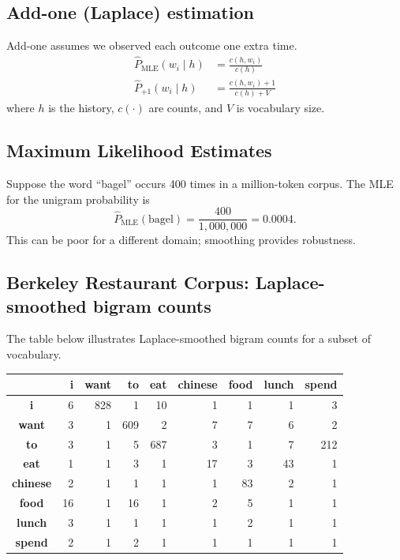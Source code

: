 \documentclass[11pt,a4paper]{article}
\theoremstyle{definition}
\theoremstyle{plain}
\theoremstyle{remark}
\begin{document}
\subsection{Add-one (Laplace) estimation}
Add-one assumes we observed each outcome one extra time.
\begin{align*}
\hat P_{\text{MLE}}(w_i\mid h) 
&= \frac{c(h,w_i)}{c(h)}\\
\hat P_{+1}(w_i\mid h) 
&= \frac{c(h,w_i)+1}{c(h)+V}
\end{align*}
where $h$ is the history, $c(\cdot)$ are counts, and $V$ is vocabulary size.

\subsection{Maximum Likelihood Estimates}
Suppose the word ``bagel'' occurs 400 times in a million-token corpus. The MLE for the unigram probability is
\[
\hat P_{\text{MLE}}(\text{bagel}) = \frac{400}{1{,}000{,}000} = 0.0004.
\]
This can be poor for a different domain; smoothing provides robustness.

\subsection{Berkeley Restaurant Corpus: Laplace-smoothed bigram counts}
The table below illustrates Laplace-smoothed bigram counts for a subset of vocabulary.

\begin{center}
\setlength{\tabcolsep}{6pt}
\renewcommand{\arraystretch}{1.2}
\scriptsize
\begin{tabular}{|c|r|r|r|r|r|r|r|r|}
\hline
 & \textbf{i} & \textbf{want} & \textbf{to} & \textbf{eat} & \textbf{chinese} & \textbf{food} & \textbf{lunch} & \textbf{spend} \\ \hline
\textbf{i}       & 6   & 828 & 1   & 10  & 1   & 1  & 1  & 3   \\ \hline
\textbf{want}    & 3   & 1   & 609 & 2   & 7   & 7  & 6  & 2   \\ \hline
\textbf{to}      & 3   & 1   & 5   & 687 & 3   & 1  & 7  & 212 \\ \hline
\textbf{eat}     & 1   & 1   & 3   & 1   & 17  & 3  & 43 & 1   \\ \hline
\textbf{chinese} & 2   & 1   & 1   & 1   & 1   & 83 & 2  & 1   \\ \hline
\textbf{food}    & 16  & 1   & 16  & 1   & 2   & 5  & 1  & 1   \\ \hline
\textbf{lunch}   & 3   & 1   & 1   & 1   & 1   & 2  & 1  & 1   \\ \hline
\textbf{spend}   & 2   & 1   & 2   & 1   & 1   & 1  & 1  & 1   \\ \hline
\end{tabular}
\end{center}
\end{document}
